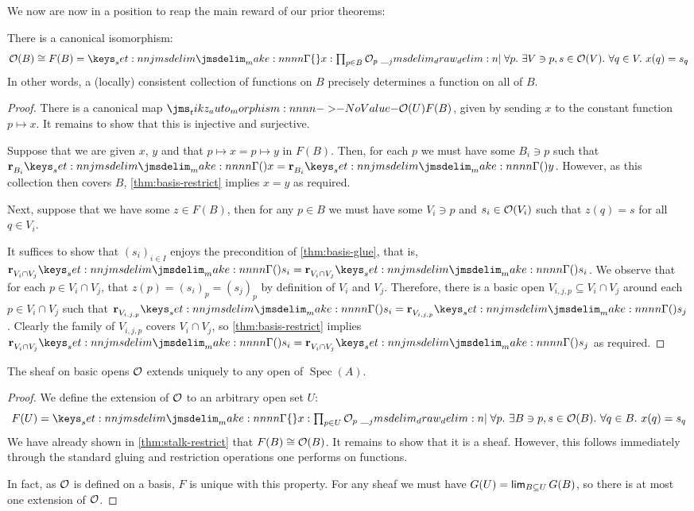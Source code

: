 \documentclass{amsart}
\DeclareMathOperator{\Spec}{Spec}
\begin{document}
We now are now in a position to reap the main reward of our prior theorems:
\begin{theorem}
  \label{thm:stalk-restrict}
  There is a canonical isomorphism:
  \[
    \StructSh(B) \cong
    F(B) =
    \braces{
      x : \textstyle\prod_{p \in B} \StructSh_p \mathrel{\delimsep{|}}
      \forall p.\ \exists V \ni p, s \in \StructSh(V).\ \forall q \in V.\ x(q) = s_q
    }
  \]
  In other words, a (locally) consistent collection of functions on $B$ precisely determines a
  function on all of $B$.
\end{theorem}
\begin{proof}
  There is a canonical map $\Mor{\StructSh(U)}{F(B)}$, given by sending $x$ to the constant
  function $p \mapsto x$. It remains to show that this is injective and surjective.

  Suppose that we are given $x$, $y$ and that $p \mapsto x = p \mapsto y$ in $F(B)$. Then, for each
  $p$ we must have some $B_i \ni p$ such that $\Res{x}{B_i} = \Res{y}{B_i}$. However, as this
  collection then covers $B$, \cref{thm:basis-restrict} implies $x = y$ as required.

  Next, suppose that we have some $z \in F(B)$, then for any $p \in B$ we must have some $V_i \ni p$
  and $s_i \in \mathcal{O}(V_i)$ such that $z(q) = s$ for all $q \in V_i$.

  It suffices to show that $(s_i)_{i \in I}$ enjoys the precondition of \cref{thm:basis-glue}, that
  is, $\Res{s_i}{V_i \cap V_j} = \Res{s_i}{V_i \cap V_j}$. We observe that for each
  $p \in V_i \cap V_j$, that $z(p) = (s_i)_p = (s_j)_p$ by definition of $V_i$ and $V_j$. Therefore,
  there is a basic open $V_{i,j,p} \subseteq V_i \cap V_j$ around each $p \in V_i \cap V_j$ such
  that $\Res{s_i}{V_{i,j,p}} = \Res{s_j}{V_{i,j,p}}$. Clearly the family of $V_{i,j,p}$ covers
  $V_i \cap V_j$, so \cref{thm:basis-restrict} implies
  $\Res{s_i}{V_i \cap V_j} = \Res{s_j}{V_i \cap V_j}$ as required.
\end{proof}

\begin{theorem}
  The sheaf on basic opens $\mathcal{O}$ extends uniquely to any open of $\Spec(A)$.
\end{theorem}
\begin{proof}
  We define the extension of $\mathcal{O}$ to an arbitrary open set $U$:
  \[
    F(U) = \braces{
      x : \textstyle\prod_{p \in U} \StructSh_p \mathrel{\delimsep{|}}
      \forall p.\ \exists B \ni p, s \in \StructSh(B).\ \forall q \in B.\ x(q) = s_q
    }
  \]
  We have already shown in \cref{thm:stalk-restrict} that $F(B) \cong \mathcal{O}(B)$. It remains to
  show that it is a sheaf. However, this follows immediately through the standard gluing and
  restriction operations one performs on functions.

  In fact, as $\mathcal{O}$ is defined on a basis, $F$ is unique with this property. For any sheaf we
  must have $G(U) = \mathop{\mathsf{lim}}_{B \subseteq U} G(B)$, so there is at most one extension of $\mathcal{O}$.
\end{proof}

\printbibliography
\end{document}
